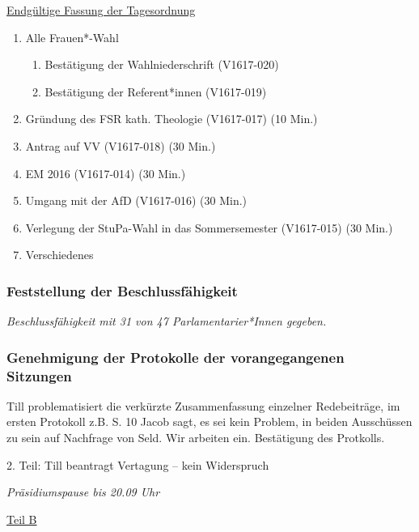 \documentclass[ngerman,headheight=70pt]{scrartcl}
\begin{document}
    \underline{Endgültige Fassung der Tagesordnung}
    \begin{enumerate}[label={\textbf{Top \theenumi}},leftmargin=*]
        \item Alle Frauen*-Wahl
            \begin{enumerate}
                \item Bestätigung der Wahlniederschrift (V1617-020)
                \item Bestätigung der Referent*innen (V1617-019)
            \end{enumerate}
        \item Gründung des FSR kath. Theologie (V1617-017) (10 Min.)
        \item Antrag auf VV (V1617-018) (30 Min.)
        \item EM 2016 (V1617-014) (30 Min.)
        \item Umgang mit der AfD (V1617-016) (30 Min.)
        \item Verlegung der StuPa-Wahl in das Sommersemester (V1617-015) (30 Min.)
        \item Verschiedenes
    \end{enumerate}

    \subsubsection{Feststellung der Beschlussfähigkeit}

    \textit{Beschlussfähigkeit mit 31 von 47 Parlamentarier*Innen gegeben.}

    \subsubsection{Genehmigung der Protokolle der vorangegangenen Sitzungen}

    Till problematisiert die verkürzte Zusammenfassung einzelner Redebeiträge,
    im ersten Protokoll z.B. S. 10 Jacob sagt, es sei kein Problem, in beiden
    Ausschüssen zu sein auf Nachfrage von Seld.
    Wir arbeiten ein. Bestätigung des Protkolls.

    2. Teil: Till beantragt Vertagung – kein Widerspruch

    \textit{Präsidiumspause bis 20.09 Uhr}

    \vspace{1cm}
    {\Large \underline{Teil B}}
\end{document}
